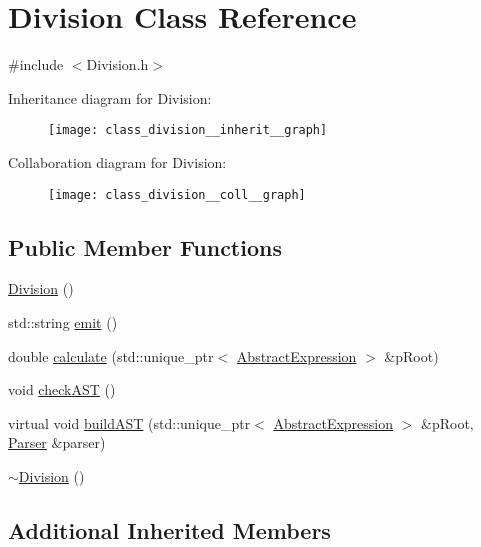 \hypertarget{class_division}{}\section{Division Class Reference}
\label{class_division}


{\ttfamily \#include $<$Division.\+h$>$}



Inheritance diagram for Division\+:
\nopagebreak
\begin{figure}[H]
\begin{center}
\leavevmode
\texttt{[image: class\_division\_\_inherit\_\_graph]}
\end{center}
\end{figure}


Collaboration diagram for Division\+:
\nopagebreak
\begin{figure}[H]
\begin{center}
\leavevmode
\texttt{[image: class\_division\_\_coll\_\_graph]}
\end{center}
\end{figure}
\subsection*{Public Member Functions}
\begin{DoxyCompactItemize}
\item 
\mbox{\hyperlink{class_division_a1cae0ab3b18df50d9986d2b879b7f464}{Division}} ()
\item 
std\+::string \mbox{\hyperlink{class_division_a98e3e9ebf0c3e305ba5d43b245f3815b}{emit}} ()
\item 
double \mbox{\hyperlink{class_division_a3b5308f2382926667d23c9fa8267480e}{calculate}} (std\+::unique\+\_\+ptr$<$ \mbox{\hyperlink{class_abstract_expression}{Abstract\+Expression}} $>$ \&p\+Root)
\item 
void \mbox{\hyperlink{class_division_a3ab537039d60a6464fffaa909536f449}{check\+A\+ST}} ()
\item 
virtual void \mbox{\hyperlink{class_division_a217df7aed2f8edd71bce9a196243fc81}{build\+A\+ST}} (std\+::unique\+\_\+ptr$<$ \mbox{\hyperlink{class_abstract_expression}{Abstract\+Expression}} $>$ \&p\+Root, \mbox{\hyperlink{class_parser}{Parser}} \&parser)
\item 
\mbox{\hyperlink{class_division_a7f08073a7e2e201182af12610cd5e3eb}{$\sim$\+Division}} ()
\end{DoxyCompactItemize}
\subsection*{Additional Inherited Members}


